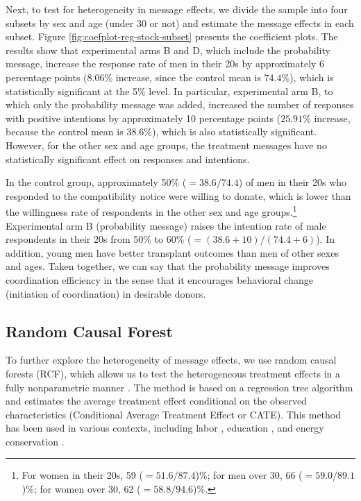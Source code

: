 \documentclass[12pt, a4paper]{article}
\begin{document}
Next, to test for heterogeneity in message effects, we divide the sample into four subsets by sex and age (under 30 or not) and estimate the message effects in each subset. Figure \ref{fig:coefplot-reg-stock-subset} presents the coefficient plots. The results show that experimental arms B and D, which include the probability message, increase the response rate of men in their 20s by approximately 6 percentage points (\(8.06\)\% increase, since the control mean is \(74.4\)\%), which is statistically significant at the 5\% level. In particular, experimental arm B, to which only the probability message was added, increased the number of responses with positive intentions by approximately 10 percentage points (\(25.91\)\% increase, because the control mean is \(38.6\)\%), which is also statistically significant. However, for the other sex and age groups, the treatment messages have no statistically significant effect on responses and intentions.

In the control group, approximately 50\% (\(=38.6/74.4\)) of men in their 20s who responded to the compatibility notice were willing to donate, which is lower than the willingness rate of respondents in the other sex and age groups.\footnote{For women in their 20s, 59 (\(=51.6/87.4\))\%; for men over 30, 66 (\(=59.0/89.1\))\%; for women over 30, 62 (\(=58.8/94.6\))\%.} Experimental arm B (probability message) raises the intention rate of male respondents in their 20s from 50\% to 60\% (\(=(38.6 + 10)/(74.4 + 6)\)). In addition, young men have better transplant outcomes than men of other sexes and ages. Taken together, we can say that the probability message improves coordination efficiency in the sense that it encourages behavioral change (initiation of coordination) in desirable donors.

\hypertarget{rcf}{%
\subsection{Random Causal Forest}\label{rcf}}

To further explore the heterogeneity of message effects, we use random causal forests (RCF), which allows us to test the heterogeneous treatment effects in a fully nonparametric manner \citep{Athey2016, Wager2018}. The method is based on a regression tree algorithm and estimates the average treatment effect conditional on the observed characteristics (Conditional Average Treatment Effect or CATE). This method has been used in various contexts, including labor \citep{Davis2017}, education \citep{Carlana2022}, and energy conservation \citep{Murakami2022}.
\end{document}
